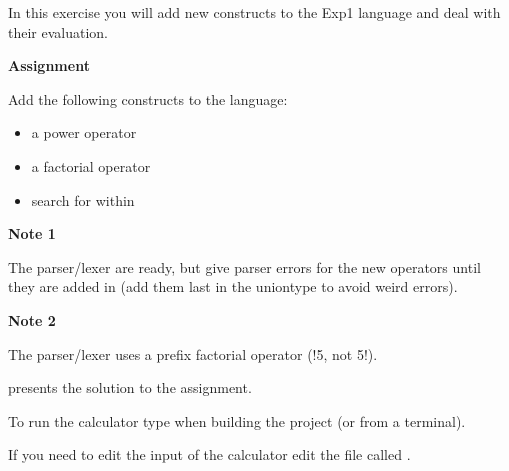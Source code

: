 In this exercise you will add new constructs to the Exp1 language and deal with
their evaluation.

{\bf Assignment}

Add the following constructs to the language:
\begin{itemize}
\item a power operator
\item a factorial operator
\item search for  within 
\end{itemize}

{\bf Note 1}

The parser/lexer are ready, but give parser errors for the new operators
until they are added in  (add them last in the uniontype to avoid weird
errors).

{\bf Note 2}

The parser/lexer uses a prefix factorial operator (!5, not 5!).

 presents the solution to the assignment.

To run the calculator type  when building the project (or  from a terminal).

If you need to edit the input of the calculator edit the file called .
